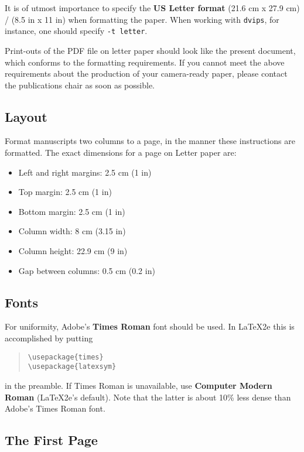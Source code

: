 \documentclass[11pt]{article}
\begin{document}
It is of utmost importance to specify the \textbf{US Letter format}
(21.6 cm x 27.9 cm) / (8.5 in x 11 in) when formatting the paper. When working with
{\tt dvips}, for instance, one should specify {\tt -t letter}.

Print-outs of the PDF file on letter paper should look like the present
document, which conforms to the formatting requirements. If you cannot
meet the above requirements about the production of your camera-ready
paper, please contact the publications chair as soon as possible.


\subsection{Layout}
\label{ssec:layout}

Format manuscripts two columns to a page, in the manner these
instructions are formatted. The exact dimensions for a page on
Letter paper are:

\begin{itemize}
\item Left and right margins: 2.5 cm (1 in)
\item Top margin: 2.5 cm (1 in)
\item Bottom margin: 2.5 cm (1 in)
\item Column width: 8 cm (3.15 in)
\item Column height: 22.9 cm (9 in)
\item Gap between columns: 0.5 cm (0.2 in)
\end{itemize}


\subsection{Fonts}

For uniformity, Adobe's {\bf Times Roman} font should be
used. In \LaTeX2e{} this is accomplished by putting

\begin{quote}
\begin{verbatim}
\usepackage{times}
\usepackage{latexsym}
\end{verbatim}
\end{quote}
in the preamble. If Times Roman is unavailable, use {\bf Computer
  Modern Roman} (\LaTeX2e{}'s default).  Note that the latter is about
  10\% less dense than Adobe's Times Roman font.


\subsection{The First Page}
\label{ssec:first}
\end{document}
